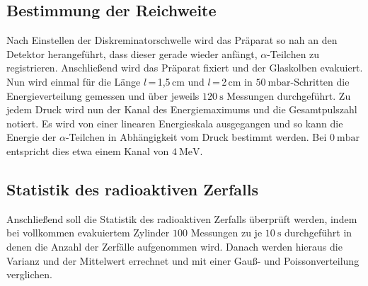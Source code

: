 \subsection{Bestimmung der Reichweite}
Nach Einstellen der Diskreminatorschwelle wird das Präparat so nah an den Detektor herangeführt, dass dieser gerade wieder anfängt, $\alpha$-Teilchen zu registrieren. Anschließend wird das Präparat fixiert und der Glaskolben 
evakuiert. Nun wird einmal für die Länge $l$\,=\,1,5\,cm  und $l$\,=\,2\,cm in $\SI{50}{\milli\bar}$-Schritten die Energieverteilung gemessen und über jeweils $\SI{120}{\second}$ Messungen durchgeführt. Zu jedem Druck 
wird nun der Kanal des Energiemaximums und die Gesamtpulszahl notiert. Es wird von einer linearen Energieskala ausgegangen und so kann die Energie der $\alpha$-Teilchen in Abhängigkeit vom Druck bestimmt werden. Bei 
$\SI{0}{\milli\bar}$ entspricht dies etwa einem Kanal von $\SI{4}{\mega\electronvolt}$.

\subsection{Statistik des radioaktiven Zerfalls}
Anschließend soll die Statistik des radioaktiven Zerfalls überprüft werden, indem bei vollkommen evakuiertem Zylinder $100$ Messungen zu je $\SI{10}{\second}$ durchgeführt in denen die Anzahl der Zerfälle aufgenommen wird. 
Danach werden hieraus die Varianz und der Mittelwert errechnet und mit einer Gauß- und Poissonverteilung verglichen. 